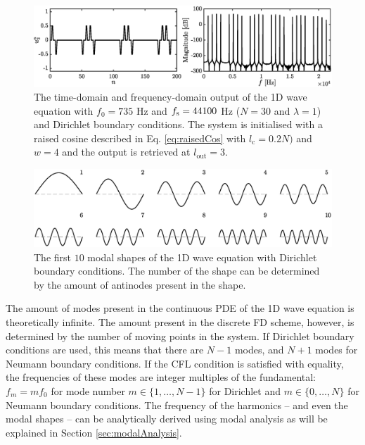 \begin{figure}[h]
    \includegraphics[width=\textwidth]{figures/fdtd/oneDWaveOutput.eps}
    \caption{The time-domain and frequency-domain output of the 1D wave equation with $f_0 = 735$ Hz and $f_\text{s} = 44100$ Hz ($N = 30$ and $\lambda = 1$) and Dirichlet boundary conditions. The system is initialised with a raised cosine described in Eq. \eqref{eq:raisedCos} with $l_\text{c} = 0.2N)$ and $w=4$ and the output is retrieved at $l_\text{out} = 3$. \label{fig:1DWaveOutput}}
\end{figure}

\begin{figure}[h]
    \includegraphics[width=\textwidth]{figures/fdtd/modes.eps}
    \caption{The first $10$ modal shapes of the 1D wave equation with Dirichlet boundary conditions. The number of the shape can be determined by the amount of antinodes present in the shape. \label{fig:modes}}
\end{figure}

The amount of modes present in the continuous PDE of the 1D wave equation is theoretically infinite. The amount present in the discrete FD scheme, however, is determined by the number of moving points in the system. If Dirichlet boundary conditions are used, this means that there are $N-1$ modes, and $N+1$ modes for Neumann boundary conditions. If the CFL condition is satisfied with equality, the frequencies of these modes are integer multiples of the fundamental: $f_m = mf_0$ for mode number $m \in \{1, \hdots, N-1\}$ for Dirichlet and $m \in \{0, \hdots, N\}$ for Neumann boundary conditions. The frequency of the harmonics -- and even the modal shapes -- can be analytically derived using modal analysis as will be explained in Section \ref{sec:modalAnalysis}.

